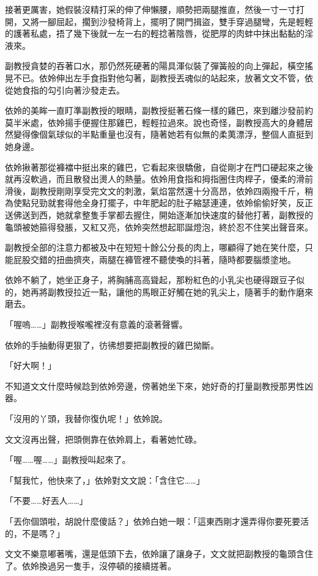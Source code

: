 接著更厲害，她假裝沒精打采的伸了伸懶腰，順勢把兩腿推直，然後一寸一寸打開，又將一腳屈起，擱到沙發椅背上，擺明了開門揖盜，雙手穿過腿彎，先是輕輕的護著私處，捂了幾下後就一左一右的輕捻著陰唇，從肥厚的肉蚌中抹出黏黏的淫液來。

副教授貪婪的吞著口水，那仍然死硬著的陽具渾似裝了彈簧般的向上彈起，橫空搖晃不已。依姈伸出左手食指對他勾著，副教授丟魂似的站起來，放著文文不管，依從她食指的勾引向著沙發走去。

依姈的美眸一直盯準副教授的眼睛，副教授挺著石條一樣的雞巴，來到離沙發前約莫半米處，依姈揚手便握住那雞巴，輕輕拉過來。說也奇怪，副教授高大的身體居然變得像個氣球似的半點重量也沒有，隨著她若有似無的柔荑漂浮，整個人直挺到她身邊。

依姈揪著那從褲襠中挺出來的雞巴，它看起來很驕傲，自從剛才在門口硬起來之後就再沒軟過，而且散發出燙人的熱量。依姈用食指和拇指圈住肉桿子，優柔的滑前滑後，副教授剛剛享受完文文的刺激，氣焰當然還十分高昂，依姈四兩撥千斤，稍為使點兒勁就套得他全身打擺子，中年肥起的肚子縮瑟連連，依姈偷偷好笑，反正送佛送到西，她就拿整隻手掌都去握住，開始逐漸加快速度的替他打著，副教授的龜頭被她箍得發脹，又紅又亮，依姈突然想起耶誕燈泡，終於忍不住笑出聲音來。

副教授全部的注意力都被及中在短短十餘公分長的肉上，哪顧得了她在笑什麼，只能屁股交錯的扭曲擠夾，兩腿在褲管裡不聽使喚的抖著，隨時都要腦漿塗地。

依姈不躺了，她坐正身子，將胸脯高高聳起，那粉紅色的小乳尖也硬得跟豆子似的，她再將副教授拉近一點，讓他的馬眼正好觸在她的乳尖上，隨著手的動作磨來磨去。

「喔嗚……」副教授喉嚨裡沒有意義的滾著聲響。

依姈的手抽動得更狠了，彷彿想要把副教授的雞巴拗斷。

「好大啊！」

不知道文文什麼時候踗到依姈旁邊，傍著她坐下來，她好奇的打量副教授那男性凶器。

「沒用的丫頭，我替你復仇呢！」依姈說。

文文沒再出聲，把頭側靠在依姈肩上，看著她忙碌。

「喔……喔……」副教授叫起來了。

「幫我忙，他快來了，」依姈對文文說：「含住它……」

「不要……好丟人……」

「丟你個頭啦，胡說什麼傻話？」依姈白她一眼：「這東西剛才還弄得你要死要活的，不是嗎？」

文文不樂意嘟著嘴，還是低頭下去，依姈讓了讓身子，文文就把副教授的龜頭含住了。依姈換過另一隻手，沒停頓的接續搓著。


